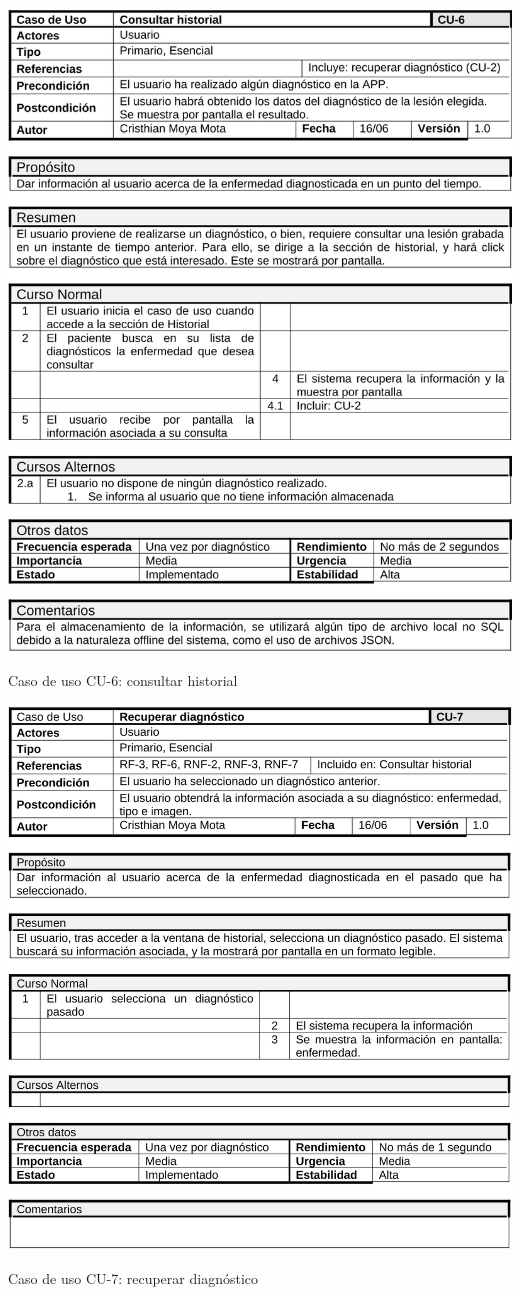 \begin{table}[H]
	\centering
	\includegraphics[scale=0.45]{imagenes/cu-6.png}
	\caption{Caso de uso CU-6: consultar historial}
	\label{fig:cu6}
\end{table}

\begin{table}[H]
	\centering
	\includegraphics[scale=0.375]{imagenes/cu-7.png}
	\caption{Caso de uso CU-7: recuperar diagnóstico}
	\label{fig:cu7}
\end{table}

